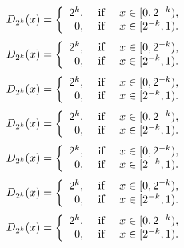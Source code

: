\documentclass{amsart}
\numberwithin{equation}{section}
\begin{document}
{
\begin{equation*} 
D_{2^k}(x)=\left\{
\begin{array}{rcl}
2^k, &\hbox{ if }& x\in[0,2^{-k}),\\
0, &\hbox{ if }& x\in[2^{-k},1).
\end{array}
\right.
 \end{equation*}\fi  
{}\begin{equation}
D_{2^k}(x)=\left\{
\begin{array}{rcl}
2^k, &\hbox{ if }& x\in[0,2^{-k}),\\
0, &\hbox{ if }& x\in[2^{-k},1).
\end{array}
\right.
\end{equation}\fi   
{}\begin{align*}
D_{2^k}(x)=\left\{
\begin{array}{rcl}
2^k, &\hbox{ if }& x\in[0,2^{-k}),\\
0, &\hbox{ if }& x\in[2^{-k},1).
\end{array}
\right.
\end{align*}\fi   
{}\begin{align}
D_{2^k}(x)=\left\{
\begin{array}{rcl}
2^k, &\hbox{ if }& x\in[0,2^{-k}),\\
0, &\hbox{ if }& x\in[2^{-k},1).
\end{array}
\right.
\end{align}\fi    
{}\begin{gather*}
D_{2^k}(x)=\left\{
\begin{array}{rcl}
2^k, &\hbox{ if }& x\in[0,2^{-k}),\\
0, &\hbox{ if }& x\in[2^{-k},1).
\end{array}
\right.
\end{gather*}\fi  
{}\begin{gather}
D_{2^k}(x)=\left\{
\begin{array}{rcl}
2^k, &\hbox{ if }& x\in[0,2^{-k}),\\
0, &\hbox{ if }& x\in[2^{-k},1).
\end{array}
\right.
\end{gather}\fi   
{}\begin{multline*}
D_{2^k}(x)=\left\{
\begin{array}{rcl}
2^k, &\hbox{ if }& x\in[0,2^{-k}),\\
0, &\hbox{ if }& x\in[2^{-k},1).
\end{array}
\right.
\end{multline*}\fi  
{}\begin{multline}

\end{multline}}
\end{document}
